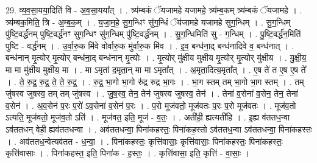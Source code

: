 \documentclass[17pt]{extarticle}
\begin{document}
29. व्य॒व॒सा॒यया॒दिति॑ वि - अ॒व॒सा॒यया᳚त् । . त्र्य॑म्बकं ॅयजामहे यजामहे॒ त्र्य॑म्ब॒कम् त्र्य॑म्बकं ॅयजामहे । . त्र्य॑म्बक॒मिति॒ त्रि - अ॒म्ब॒क॒म् । . य॒जा॒म॒हे॒ सु॒ग॒न्धिꣳ सु॑ग॒न्धिं ॅय॑जामहे यजामहे सुग॒न्धिम् । . सु॒ग॒न्धिम् पु॑ष्टि॒वर्द्ध॑नम् पुष्टि॒वर्द्ध॑नꣳ सुग॒न्धिꣳ सु॑ग॒न्धिम् पु॑ष्टि॒वर्द्ध॑नम् । . सु॒ग॒न्धिमिति॑ सु - ग॒न्धिम् । . पु॒ष्टि॒वर्द्ध॑न॒मिति॑ पुष्टि - वर्द्ध॑नम् । . उ॒र्वा॒रु॒क मि॑वे वोर्वारु॒क मु॑र्वारु॒क मि॑व । . इ॒व॒ बन्ध॑ना॒द् बन्ध॑नादिवे व॒ बन्ध॑नात् । . बन्ध॑नान् मृ॒त्योर् मृ॒त्योर् बन्ध॑ना॒द् बन्ध॑नान् मृ॒त्योः । . मृ॒त्योर् मु॑क्षीय मुक्षीय मृ॒त्योर् मृ॒त्योर् मु॑क्षीय । . मु॒क्षी॒य॒ मा मा मु॑क्षीय मुक्षीय॒ मा । . मा ऽमृता॑ द॒मृता॒न् मा मा ऽमृता᳚त् । . अ॒मृता॒दित्य॒मृता᳚त् । . ए॒ष ते॑ त ए॒ष ए॒ष ते᳚ । . ते॒ रु॒द्र॒ रु॒द्र॒ ते॒ ते॒ रु॒द्र॒ । . रु॒द्र॒ भा॒गो भा॒गो रु॑द्र रुद्र भा॒गः । . भा॒ग स्तम् तम् भा॒गो भा॒ग स्तम् । . तम् जु॑षस्व जुषस्व॒ तम् तम् जु॑षस्व । . जु॒ष॒स्व॒ तेन॒ तेन॑ जुषस्व जुषस्व॒ तेन॑ । . तेना॑ व॒सेना॑ व॒सेन॒ तेन॒ तेना॑ व॒सेन॑ । . अ॒व॒सेन॑ प॒रः प॒रो॑ ऽव॒सेना॑ व॒सेन॑ प॒रः । . प॒रो मूज॑वतो॒ मूज॑वतः प॒रः प॒रो मूज॑वतः । . मूज॑व॒तो ऽत्यति॒ मूज॑वतो॒ मूज॑व॒तो ऽति॑ । . मूज॑वत॒ इति॒ मूज॑ - व॒तः॒ । . अती॑ही॒ ह्यत्यती॑हि । . इ॒ह्य व॑ततध॒न्वा ऽव॑ततधन् वेही॒ ह्यव॑ततधन्वा । . अव॑ततधन्वा॒ पिना॑कहस्तः॒ पिना॑कह॒स्तो ऽव॑ततध॒न्वा ऽव॑ततधन्वा॒ पिना॑कहस्तः । . अव॑ततध॒न्वेत्यव॑तत - ध॒न्वा॒ । . पिना॑कहस्तः॒ कृत्ति॑वासाः॒ कृत्ति॑वासाः॒ पिना॑कहस्तः॒ पिना॑कहस्तः॒ कृत्ति॑वासाः । . पिना॑कहस्त॒ इति॒ पिना॑क - ह॒स्तः॒ । . कृत्ति॑वासा॒ इति॒ कृत्ति॑ - वा॒साः॒ । \newline
\end{document}
